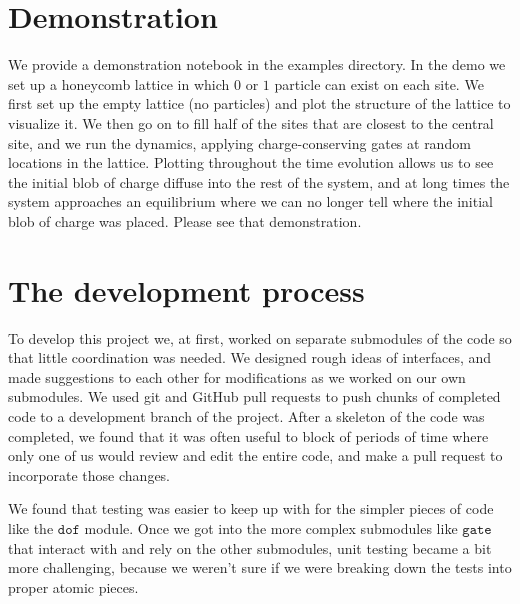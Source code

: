 \documentclass{article}
\begin{document}
\section{Demonstration}
\label{sec:demo}
We provide a demonstration notebook in the examples directory. In the demo we set up a honeycomb lattice in which $0$ or $1$ particle can exist on each site. We first set up the empty lattice (no particles) and plot the structure of the lattice to visualize it. We then go on to fill half of the sites that are closest to the central site, and we run the dynamics, applying charge-conserving gates at random locations in the lattice. Plotting throughout the time evolution allows us to see the initial blob of charge diffuse into the rest of the system, and at long times the system approaches an equilibrium where we can no longer tell where the initial blob of charge was placed. Please see that demonstration.

\section{The development process}
To develop this project we, at first, worked on separate submodules of the code so that little coordination was needed. We designed rough ideas of interfaces, and made suggestions to each other for modifications as we worked on our own submodules. We used git and GitHub pull requests to push chunks of completed code to a development branch of the project. After a skeleton of the code was completed, we found that it was often useful to block of periods of time where only one of us would review and edit the entire code, and make a pull request to incorporate those changes.

We found that testing was easier to keep up with for the simpler pieces of code like the $\texttt{dof}$ module. Once we got into the more complex submodules like $\texttt{gate}$ that interact with and rely on the other submodules, unit testing became a bit more challenging, because we weren't sure if we were breaking down the tests into proper atomic pieces.
\end{document}
